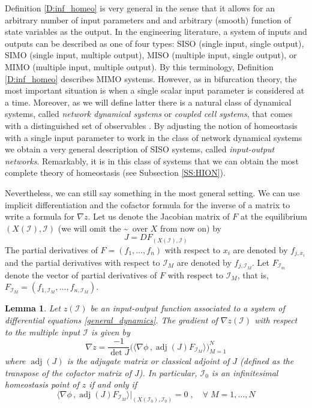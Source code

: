 \documentclass[a4paper,fleqn]{cas-dc}
\newcommand{\II}{{\mathcal I}}
\DeclareMathOperator{\adj}{adj}
\newtheorem{lemma}[theorem]{Lemma}
\begin{document}
Definition \ref{D:inf_homeo} is very general in the sense that it allows for an arbitrary number of input parameters and and arbitrary (smooth) function of state variables as the output.
In the engineering literature, a system of inputs and outputs can be described as one of four types: SISO (single input, single output), SIMO (single input, multiple output), MISO (multiple input, single output), or MIMO (multiple input, multiple output).
By this terminology, Definition \ref{D:inf_homeo} describes MIMO systems.
However, as in bifurcation theory, the most important situation is when a single scalar input parameter is considered at a time.
Moreover, as we will define latter there is a natural class of dynamical systems, called {\em network dynamical systems} or {\em coupled cell systems}, that comes with a distinguished set of observables \cite{gs2023}. 
By adjusting the notion of homeostasis with a single input parameter to work in the class of network dynamical systems we obtain a very general description of SISO systems, called {\em input-output networks}.
Remarkably, it is in this class of systems that we can obtain the most complete theory of homeostasis (see Subsection \ref{SS:HION}).

Nevertheless, we can still say something in the most general setting.
We can use implicit differentiation and the cofactor formula for the inverse of a matrix to write a formula for 
$\nabla z$.
Let us denote the Jacobian matrix of $F$ at the equilibrium $(X(\mathcal{I}),\mathcal{I})$ (we will omit the \textasciitilde\, over $X$ from now on) by
\[
J = DF_{(X(\II),\II)}
\]
The partial derivatives of $F=(f_1,\ldots,f_n)$ with respect to $x_i$ are denoted by
$f_{j,x_i}$ and the partial derivatives with respect to $\II_M$ are denoted by $f_{j,\II_M}$. 
Let $F_{\II_m}$ denote the vector of partial derivatives of $F$ with respect to $\II_M$, that is, $F_{\II_M}=(f_{1,\II_M},\ldots,f_{n,\II_M})$.

\begin{lemma} \label{t:z_nabla}
Let $z(\mathcal{I})$ be an input-output function associated to a system of differential equations \eqref{general_dynamics}.
The gradient of $\nabla z(\II)$ with respect to the multiple input $\II$ is given by
\begin{equation} \label{e:z_prime}
\nabla z =  
\frac{-1}{\det J} 
\bigg(\langle \nabla \phi\, , \adj(J) F_{\II_M} \rangle \bigg)_{M=1}^N
\end{equation}
where $\adj(J)$ is the \emph{adjugate matrix} or \emph{classical adjoint} of $J$ (defined as the transpose of the cofactor matrix of $J$).
In particular, $\II_0$ is an infinitesimal homeostasis point of $z$ if and only if
\begin{equation} \label{e:cond_homeo}
 \langle \nabla \phi \, , \adj(J) F_{\II_M}\rangle \big|_{(X(\II_0),\II_0)} = 0 \;,\quad\forall\; M=1,\ldots,N
\end{equation}
\end{lemma}
\end{document}
